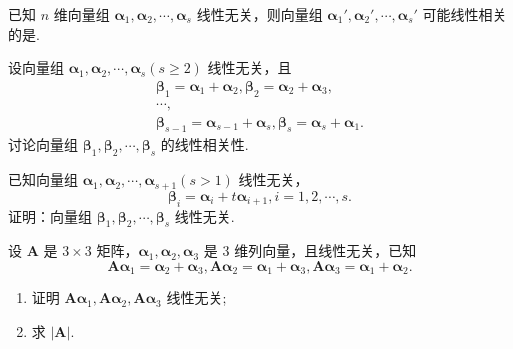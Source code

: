 	\begin{titwo}
		已知 $n$ 维向量组 $\bm \alpha_{1}, \bm \alpha_{2}, \cdots, \bm \alpha_{s}$ 线性无关，则向量组 $\bm \alpha_{1}', \bm \alpha_{2}', \cdots, \bm \alpha_{s}'$ 可能线性相关的是\kuo.

	\end{titwo}

	\begin{titwo}
		设向量组 $\bm \alpha_{1}, \bm \alpha_{2}, \cdots, \bm \alpha_{s}(s \geq 2)$ 线性无关，且
		\begin{gather*}
			\bm \beta_{1} = \bm \alpha_{1} + \bm \alpha_{2},
			\bm \beta_{2} = \bm \alpha_{2} + \bm \alpha_{3},\\
			\cdots,\\
			\bm \beta_{s - 1} = \bm \alpha_{s - 1} + \bm \alpha_{s},
			\bm \beta_{s} = \bm \alpha_{s} + \bm \alpha_{1}.
		\end{gather*}
		讨论向量组 $\bm \beta_{1}, \bm \beta_{2}, \cdots, \bm \beta_{s}$ 的线性相关性.
	\end{titwo}

	\begin{titwo}
        已知向量组 $\bm \alpha_{1}, \bm \alpha_{2}, \cdots, \bm \alpha_{s + 1}(s > 1)$ 线性无关，
        \[
            \bm \beta_{i} = \bm \alpha_{i} + t \bm \alpha_{i+1}, i = 1,2,\cdots,s.
        \]
        证明：向量组 $\bm \beta_{1},\bm \beta_{2},\cdots,\bm \beta_{s}$ 线性无关.
	\end{titwo}

	\begin{titwo}
		设 $\bm A$ 是 $3 \times 3$ 矩阵，$\bm \alpha_{1},\bm \alpha_{2},\bm \alpha_{3}$ 是 $3$ 维列向量，且线性无关，已知
		\[
			\bm A \bm \alpha_{1} = \bm \alpha_{2} + \bm \alpha_{3},
			\bm A \bm \alpha_{2} = \bm \alpha_{1} + \bm \alpha_{3},
			\bm A \bm \alpha_{3} = \bm \alpha_{1} + \bm \alpha_{2}.
		\]
		\begin{enumerate}
			\item 证明 $\bm A \bm \alpha_{1},\bm A \bm \alpha_{2},\bm A \bm \alpha_{3}$ 线性无关;
			\item 求 $|\bm A|$.
		\end{enumerate}
	\end{titwo}

